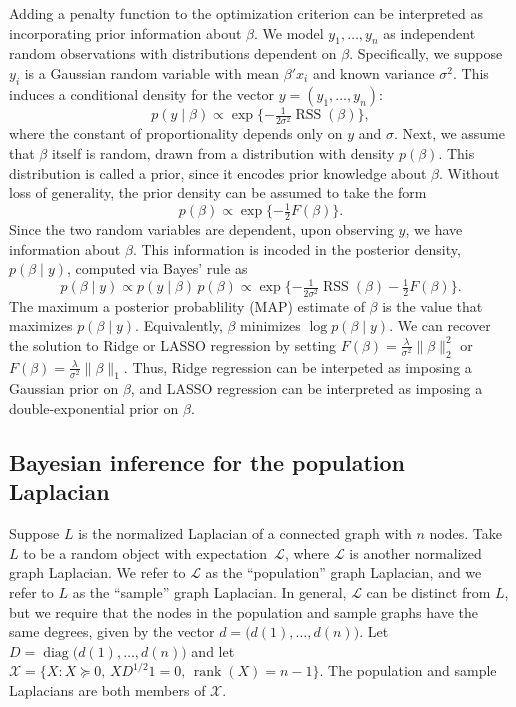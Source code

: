 \documentclass[12pt]{article}
\DeclareMathOperator*{\diag}{diag}
\DeclareMathOperator*{\rank}{rank}
\DeclareMathOperator*{\RSS}{RSS}
\theoremstyle{plain}
\begin{document}
Adding a penalty function to the optimization criterion can be
interpreted as incorporating prior information about $\beta$.  We
model $y_1, \dotsc, y_n$ as independent random observations with
distributions dependent on $\beta$.  Specifically, we suppose $y_i$ is
a Gaussian random variable with mean $\beta' x_i$ and known variance
$\sigma^2$.  This induces a conditional density for the vector
$y = (y_1, \dotsc, y_n)$:
\begin{equation}\label{E:regression-density}
  p(y \mid \beta)
    \propto
     \exp\{ -\tfrac{1}{2 \sigma^2} \RSS(\beta) \},
\end{equation}
where the constant of proportionality depends only on $y$ and $\sigma$.
Next, we assume that $\beta$ itself is random, drawn from a
distribution with density $p(\beta)$.  This distribution is called a
prior, since it encodes prior knowledge about $\beta$.  Without loss
of generality, the prior density can be assumed to take the form
\begin{equation}\label{E:regression-prior}
  p(\beta) \propto \exp\{ -\tfrac{1}{2} F(\beta) \}.
\end{equation}
Since the two random variables are dependent, upon observing $y$, we
have information about $\beta$.  This information is incoded in the
posterior density, $p(\beta \mid y)$, computed via
Bayes' rule as
\begin{equation}\label{E:regression-posterior}
  p(\beta \mid y)
    \propto p(y \mid \beta) \, p(\beta)
    \propto \exp\{ -\tfrac{1}{2 \sigma^2} \RSS(\beta) - \tfrac{1}{2} F(\beta) \}.
\end{equation}
The maximum a posterior probablility (MAP) estimate of $\beta$ is the
value that maximizes $p(\beta \mid y)$.  Equivalently, $\beta$
minimizes $\log p(\beta \mid y)$.  We can recover the solution to
Ridge or LASSO regression by setting
$F(\beta) = \tfrac{\lambda}{\sigma^2} \| \beta \|_2^2$ or
$F(\beta) = \tfrac{\lambda}{\sigma^2} \| \beta \|_1$.  Thus, Ridge
regression can be interpeted as imposing a Gaussian prior on $\beta$,
and LASSO regression can be interpreted as imposing a
double-exponential prior on $\beta$.


\subsection{Bayesian inference for the population Laplacian}
\label{S:bayesian-laplacian}

Suppose $L$ is the normalized Laplacian of a connected graph with $n$
nodes.  Take $L$ to be a random object with expectation~$\mathcal{L}$,
where $\mathcal{L}$ is another normalized graph Laplacian.  We refer to $\mathcal{L}$ as the
``population'' graph Laplacian, and we refer to $L$ as the ``sample''
graph Laplacian.  In general, $\mathcal{L}$ can be distinct from $L$,
but we require that the nodes in the population and sample graphs have
the same degrees, given by the vector $d = \big(d(1), \dotsc,
d(n)\big)$. Let $D = \diag\big(d(1), \dotsc, d(n)\big)$ and let
$\mathcal{X} = \{ X : X \succeq 0, \, X D^{1/2} 1 = 0, \, \rank(X) = n - 1 \}$.  The
population and sample Laplacians are both members of $\mathcal{X}$.
\end{document}
